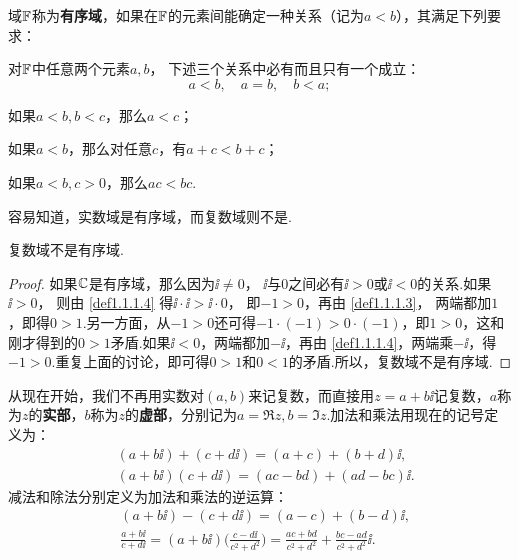 \begin{definition}\label{def1.1.1}
域$\mathbb F$称为\textbf{有序域}，如果在$\mathbb F$的元素间能确定一种关系（记为$a<b$），其满足下列要求：
\begin{eenum}
  \item \label{def1.1.1.1}对$\mathbb F$中任意两个元素$a,b$， 下述三个关系中必有而且只有一个成立：
    \[
      a < b, \quad a = b,\quad b < a;
    \]
  \item \label{def1.1.1.2}如果$a<b,b<c$，那么$a<c$；
  \item \label{def1.1.1.3}如果$a<b$，那么对任意$c$，有$a+c<b+c$；
  \item \label{def1.1.1.4}如果$a<b,c>0$，那么$ac<bc$.
\end{eenum}
\end{definition}
容易知道，实数域是有序域，而复数域则不是.
\begin{theorem}\label{thm1.1.2}
  复数域不是有序域.
\end{theorem}
\begin{proof}
  如果$\mathbb C$是有序域，那么因为$\ii\ne0$， $\ii$与$0$之间必有$\ii>0$或$\ii<0$的关系.如果$\ii>0$， 则由 \ref{def1.1.1.4} 得$\ii\cdot\ii>\ii\cdot0$， 即$-1>0$，再由 \ref{def1.1.1.3}， 两端都加$1$，即得$0>1$.另一方面，从$-1>0$还可得$-1\cdot(-1)>0\cdot(-1)$，即$1>0$，这和刚才得到的$0>1$矛盾.如果$\ii<0$，两端都加$-\ii$，再由 \ref{def1.1.1.4}，两端乘$-\ii$，得$-1>0$.重复上面的讨论，即可得$0>1$和$0<1$的矛盾.所以，复数域不是有序域.
\end{proof}

从现在开始，我们不再用实数对$(a,b)$来记复数，而直接用$z=a+b\ii$记复数，$a$称为$z$的\textbf{实部}，$b$称为$z$的\textbf{虚部}，分别记为$a=\Re z,b=\Im z$.加法和乘法用现在的记号定义为：
\begin{align*}
  & (a + b\ii) + (c + d\ii) = (a + c) + (b + d)\ii,\\
  & (a + b\ii) (c + d\ii) = (ac - bd) + (ad - bc)\ii.
\end{align*}
减法和除法分别定义为加法和乘法的逆运算：
\begin{align*}
  & (a + b\ii) - (c + d\ii) = (a - c) + (b - d)\ii,\\
  & \frac{a + b\ii}{c + d\ii} = (a + b\ii)\bigg(\frac{c - d\ii}{c^2 + d^2}\bigg)
  = \frac{ac + bd}{c^2 + d^2} + \frac{bc - ad}{c^2 + d^2}\ii.
\end{align*}

